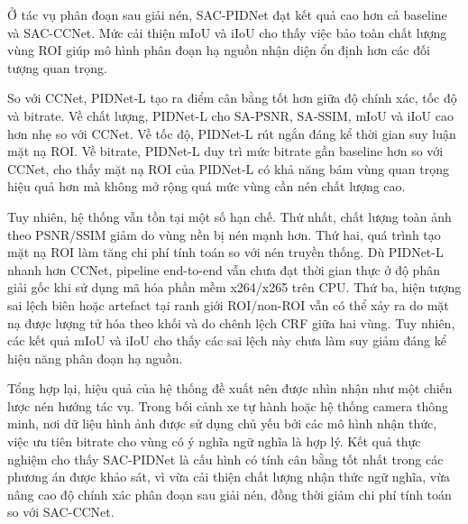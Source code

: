 Ở tác vụ phân đoạn sau giải nén, SAC-PIDNet đạt kết quả cao hơn cả baseline và SAC-CCNet. Mức cải thiện mIoU và iIoU cho thấy việc bảo toàn chất lượng vùng ROI giúp mô hình phân đoạn hạ nguồn nhận diện ổn định hơn các đối tượng quan trọng.

So với CCNet, PIDNet-L tạo ra điểm cân bằng tốt hơn giữa độ chính xác, tốc độ và bitrate. Về chất lượng, PIDNet-L cho SA-PSNR, SA-SSIM, mIoU và iIoU cao hơn nhẹ so với CCNet. Về tốc độ, PIDNet-L rút ngắn đáng kể thời gian suy luận mặt nạ ROI. Về bitrate, PIDNet-L duy trì mức bitrate gần baseline hơn so với CCNet, cho thấy mặt nạ ROI của PIDNet-L có khả năng bám vùng quan trọng hiệu quả hơn mà không mở rộng quá mức vùng cần nén chất lượng cao.

Tuy nhiên, hệ thống vẫn tồn tại một số hạn chế. Thứ nhất, chất lượng toàn ảnh theo PSNR/SSIM giảm do vùng nền bị nén mạnh hơn. Thứ hai, quá trình tạo mặt nạ ROI làm tăng chi phí tính toán so với nén truyền thống. Dù PIDNet-L nhanh hơn CCNet, pipeline end-to-end vẫn chưa đạt thời gian thực ở độ phân giải gốc khi sử dụng mã hóa phần mềm x264/x265 trên CPU. Thứ ba, hiện tượng sai lệch biên hoặc artefact tại ranh giới ROI/non-ROI vẫn có thể xảy ra do mặt nạ được lượng tử hóa theo khối và do chênh lệch CRF giữa hai vùng. Tuy nhiên, các kết quả mIoU và iIoU cho thấy các sai lệch này chưa làm suy giảm đáng kể hiệu năng phân đoạn hạ nguồn.

Tổng hợp lại, hiệu quả của hệ thống đề xuất nên được nhìn nhận như một chiến lược nén hướng tác vụ. Trong bối cảnh xe tự hành hoặc hệ thống camera thông minh, nơi dữ liệu hình ảnh được sử dụng chủ yếu bởi các mô hình nhận thức, việc ưu tiên bitrate cho vùng có ý nghĩa ngữ nghĩa là hợp lý. Kết quả thực nghiệm cho thấy SAC-PIDNet là cấu hình có tính cân bằng tốt nhất trong các phương án được khảo sát, vì vừa cải thiện chất lượng nhận thức ngữ nghĩa, vừa nâng cao độ chính xác phân đoạn sau giải nén, đồng thời giảm chi phí tính toán so với SAC-CCNet.